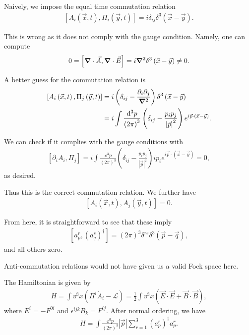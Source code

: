 Naively, we impose the equal time commutation relation
\begin{align}
    \left[ A_i \left( \vec{x},t \right) ,\Pi_i \left( \vec{y},t \right)   \right]= i \delta_{ij} \delta^3 \left( \vec{x} - \vec{y} \right)
.\end{align}

This is wrong as it does not comply with the gauge condition. Namely, one can compute
\begin{align}
    0 = \left[ \grad \cdot \vec{A}, \grad \cdot \vec{E} \right] = i \grad^2 \delta^3 \left( \vec{x} - \vec{y} \right) \neq 0
.\end{align}

A better guess for the commutation relation is
\begin{align}
    \left[ A_i \left( \vec{x},t \right) , \Pi_j \left( \vec{y},t \right)  \right] &= i \left( \delta_{ij} - \frac{\partial_i \partial_j}{\grad^2} \right) \delta^3 \left( \vec{x} - \vec{y} \right)  \\
    &= i \int \frac{\dd{^3p}}{\left( 2\pi\right)^3} \left( \delta_{ij} - \frac{p_{i} p_{j}}{\left| \vec{p} \right|^2} \right) e^{i \vec{p} \cdot \left( \vec{x} - \vec{y} \right) } 
.\end{align}

We can check if it complies with the gauge conditions with
\begin{align}
    \left[ \partial_i A_i, \Pi_j \right] = i \int \frac{\dd{^3p}}{\left( 2\pi\right)^3} \left( \delta_{ij} - \frac{p_{i}p_{j}}{\left| \vec{p} \right|^2} \right) i p_i e^{i \vec{p} \cdot \left( \vec{x} - \vec{y} \right) }  = 0
,\end{align}
as desired.

Thus this is the correct commutation relation. We further have
\begin{align}
    \left[ A_i \left( \vec{x},t \right) , A_j \left( \vec{y},t \right)  \right] = 0
.\end{align}

From here, it is straightforward to see that these imply
\begin{align}
    \left[ a^{r}_p, \left( a^{s}_q \right)^{\dag}  \right]  = \left( 2\pi \right)^3 \delta^{rs} \delta^3 \left( \vec{p} - \vec{q} \right) 
,\end{align}
and all others zero.

Anti-commutation relations would not have given us a valid Fock space here.

The Hamiltonian is given by
\begin{align}
    H = \int \dd{^3x} \left( \Pi^{i} \dot{A}_i - \mathcal{L} \right)  = \frac{1}{2} \int \dd{^3x} \left( \vec{E} \cdot \vec{E} + \vec{B} \cdot \vec{B} \right) 
,\end{align}
where $E^{i} = -F^{0i}$ and $\epsilon^{ijk} B_k = F^{ij}$. After normal ordering, we have
\begin{align}
    H = \int \frac{\dd{^3p}}{\left( 2\pi\right)^3} \left| \vec{p} \right| \sum_{r=1}^{3}  \left( a^{r}_p \right)^{\dag} a^{r}_p
.\end{align}

